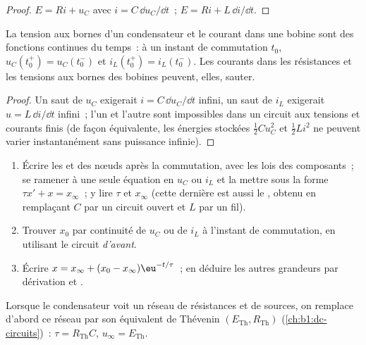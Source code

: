 \begin{proof}
 $E = Ri + u_C$ avec $i = C\,\dd u_C/\dd t$~;  $E = Ri + L\,\dd i/\dd t$.
\end{proof}

\begin{proposition}\label{prop:b1:transient-regimes:continuity}
La tension aux bornes d'un condensateur et le courant dans une bobine
sont des fonctions continues du temps~: à un instant de commutation
$t_0$, $u_C(t_0^+) = u_C(t_0^-)$ et $i_L(t_0^+) = i_L(t_0^-)$. Les
courants dans les résistances et les tensions aux bornes des bobines
peuvent, elles, sauter.
\end{proposition}

\begin{proof}
Un saut de $u_C$ exigerait $i = C\,\dd u_C/\dd t$ infini, un saut de
$i_L$ exigerait $u = L\,\dd i/\dd t$ infini~; l'un et l'autre sont
impossibles dans un circuit aux tensions et courants finis (de façon
équivalente, les énergies stockées $\tfrac12 Cu_C^2$ et $\tfrac12 Li^2$
ne peuvent varier instantanément sans puissance infinie).
\end{proof}

\begin{method}\label{met:b1:transient-regimes:first}
\begin{enumerate}
  \item Écrire les  et des nœuds après la commutation,
        avec les lois des composants~; se ramener à une seule équation
        en $u_C$ ou $i_L$ et la mettre sous la forme
        $\tau x' + x = x_\infty$~; y lire $\tau$ et $x_\infty$ (cette
        dernière est aussi le , obtenu en remplaçant $C$
        par un circuit ouvert et $L$ par un fil).
  \item Trouver $x_0$ par continuité de $u_C$ ou de $i_L$ à l'instant de
        commutation, en utilisant le circuit \emph{d'avant}.
  \item Écrire $x = x_\infty + (x_0 - x_\infty)\eu^{-t/\tau}$~; en
        déduire les autres grandeurs par dérivation et .
\end{enumerate}
Lorsque le condensateur voit un réseau de résistances et de sources, on
remplace d'abord ce réseau par son équivalent de Thévenin
$(E_{\mathrm{Th}}, R_{\mathrm{Th}})$
(\cref{ch:b1:dc-circuits})~: $\tau = R_{\mathrm{Th}}C$,
$u_\infty = E_{\mathrm{Th}}$.
\end{method}

